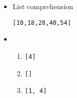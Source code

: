\begin{itemize}

\item List comprehension

\texttt{[10,18,28,40,54]}

\item 

\begin{enumerate}
    \item \texttt{[4]}
    \item \texttt{[]}
    \item \texttt{[1, 4]}
\end{enumerate}







\end{itemize}
